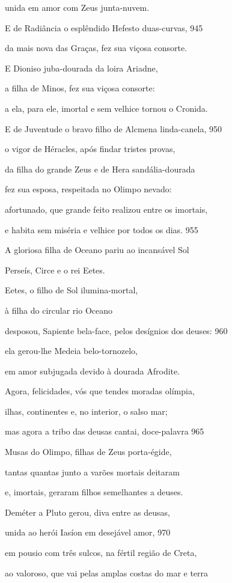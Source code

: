 unida em amor com Zeus junta-nuvem.

\quad{}E de Radiância o esplêndido Hefesto duas-curvas, \num{945}

da mais nova das Graças, fez sua viçosa consorte.

\quad{}E Dioniso juba-dourada da loira Ariadne,

a filha de Minos, fez sua viçosa consorte:

a ela, para ele, imortal e sem velhice tornou o Cronida.

\quad{}E de Juventude o bravo filho de Alcmena linda-canela, \num{950}

o vigor de Héracles, após findar tristes provas,

da filha do grande Zeus e de Hera sandália-dourada

fez sua esposa, respeitada no Olimpo nevado:

afortunado, que grande feito realizou entre os imortais,

e habita sem miséria e velhice por todos os dias. \num{955}

\quad{}A gloriosa filha de Oceano pariu ao incansável Sol

Perseís, Circe e o rei Eetes.

Eetes, o filho de Sol ilumina-mortal,

à filha do circular rio Oceano

desposou, Sapiente bela-face, pelos desígnios dos deuses: \num{960}

ela gerou-lhe Medeia belo-tornozelo,

em amor subjugada devido à dourada Afrodite.

\medskip

Agora, felicidades, vós que tendes moradas olímpia,

ilhas, continentes e, no interior, o salso mar;

mas agora a tribo das deusas cantai, doce-palavra \num{965}

Musas do Olimpo, filhas de Zeus porta-égide,

tantas quantas junto a varões mortais deitaram

e, imortais, geraram filhos semelhantes a deuses.

\quad{}Deméter a Pluto gerou, diva entre as deusas,

unida ao herói Iasíon em desejável amor, \num{970}

em pousio com três sulcos, na fértil região de Creta,

ao valoroso, que vai pelas amplas costas do mar e terra

